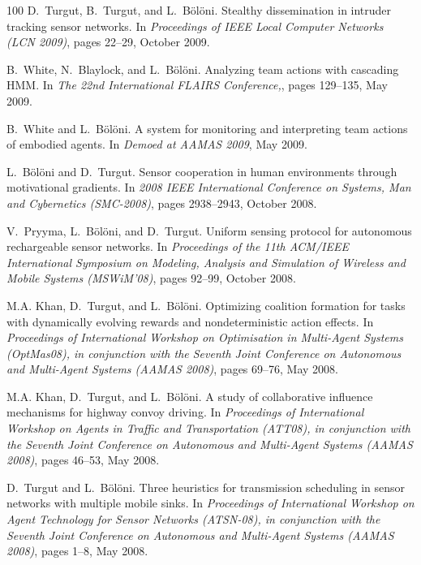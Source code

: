 \begin{thebibliography}{100}
D.~Turgut, B.~Turgut, and L.~Bölöni.
\newblock Stealthy dissemination in intruder tracking sensor networks.
\newblock In {\em Proceedings of IEEE Local Computer Networks (LCN 2009)},
  pages 22--29, October 2009.

B.~White, N.~Blaylock, and L.~Bölöni.
\newblock Analyzing team actions with cascading {HMM}.
\newblock In {\em The 22nd International FLAIRS Conference,}, pages 129--135,
  May 2009.

B.~White and L.~Bölöni.
\newblock A system for monitoring and interpreting team actions of embodied
  agents.
\newblock In {\em Demoed at AAMAS 2009}, May 2009.

L.~Bölöni and D.~Turgut.
\newblock Sensor cooperation in human environments through motivational
  gradients.
\newblock In {\em 2008 IEEE International Conference on Systems, Man and
  Cybernetics (SMC-2008)}, pages 2938--2943, October 2008.

V.~Pryyma, L.~Bölöni, and D.~Turgut.
\newblock Uniform sensing protocol for autonomous rechargeable sensor networks.
\newblock In {\em Proceedings of the 11th ACM/IEEE International Symposium on
  Modeling, Analysis and Simulation of Wireless and Mobile Systems (MSWiM'08)},
  pages 92--99, October 2008.

M.A. Khan, D.~Turgut, and L.~Bölöni.
\newblock Optimizing coalition formation for tasks with dynamically evolving
  rewards and nondeterministic action effects.
\newblock In {\em Proceedings of International Workshop on Optimisation in
  Multi-Agent Systems (OptMas08), in conjunction with the Seventh Joint
  Conference on Autonomous and Multi-Agent Systems (AAMAS 2008)}, pages 69--76,
  May 2008.

M.A. Khan, D.~Turgut, and L.~Bölöni.
\newblock A study of collaborative influence mechanisms for highway convoy
  driving.
\newblock In {\em Proceedings of International Workshop on Agents in Traffic
  and Transportation (ATT08), in conjunction with the Seventh Joint Conference
  on Autonomous and Multi-Agent Systems (AAMAS 2008)}, pages 46--53, May 2008.

D.~Turgut and L.~Bölöni.
\newblock Three heuristics for transmission scheduling in sensor networks with
  multiple mobile sinks.
\newblock In {\em Proceedings of International Workshop on Agent Technology for
  Sensor Networks (ATSN-08), in conjunction with the Seventh Joint Conference
  on Autonomous and Multi-Agent Systems (AAMAS 2008)}, pages 1--8, May 2008.


\end{thebibliography}
